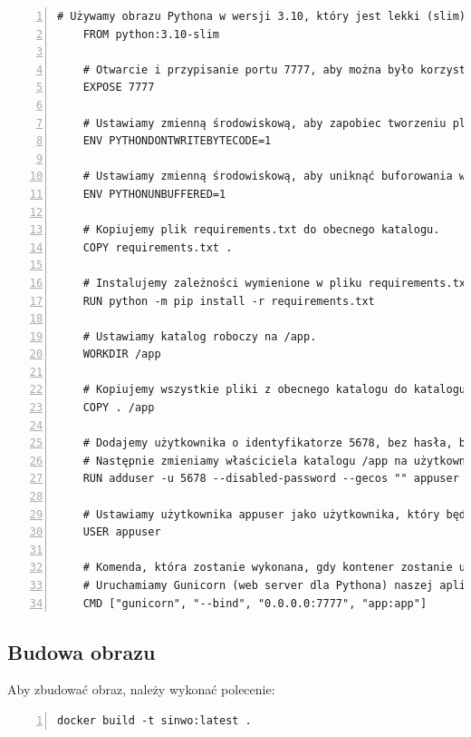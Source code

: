 \documentclass[a4paper,12pt]{article}
\begin{document}
\begin{lstlisting}[breaklines=true, basicstyle=\small, numbers=left]
    # Używamy obrazu Pythona w wersji 3.10, który jest lekki (slim).
    FROM python:3.10-slim
    
    # Otwarcie i przypisanie portu 7777, aby można było korzystać z aplikacji na tym porcie.
    EXPOSE 7777
    
    # Ustawiamy zmienną środowiskową, aby zapobiec tworzeniu plików pycache.
    ENV PYTHONDONTWRITEBYTECODE=1
    
    # Ustawiamy zmienną środowiskową, aby uniknąć buforowania w Pythonie.
    ENV PYTHONUNBUFFERED=1
    
    # Kopiujemy plik requirements.txt do obecnego katalogu.
    COPY requirements.txt .
    
    # Instalujemy zależności wymienione w pliku requirements.txt.
    RUN python -m pip install -r requirements.txt
    
    # Ustawiamy katalog roboczy na /app.
    WORKDIR /app
    
    # Kopiujemy wszystkie pliki z obecnego katalogu do katalogu /app w kontenerze.
    COPY . /app
    
    # Dodajemy użytkownika o identyfikatorze 5678, bez hasła, bez interaktywnego prompta.
    # Następnie zmieniamy właściciela katalogu /app na użytkownika appuser.
    RUN adduser -u 5678 --disabled-password --gecos "" appuser && chown -R appuser /app
    
    # Ustawiamy użytkownika appuser jako użytkownika, który będzie używany do uruchamiania kontenera.
    USER appuser
    
    # Komenda, która zostanie wykonana, gdy kontener zostanie uruchomiony.
    # Uruchamiamy Gunicorn (web server dla Pythona) naszej aplikacji na porcie 7777.
    CMD ["gunicorn", "--bind", "0.0.0.0:7777", "app:app"]
\end{lstlisting}


\newpage

\subsection{Budowa obrazu}
Aby zbudować obraz, należy wykonać polecenie:
\begin{lstlisting}[breaklines=true, basicstyle=\small, numbers=left]
    docker build -t sinwo:latest .
\end{lstlisting}
\end{document}
